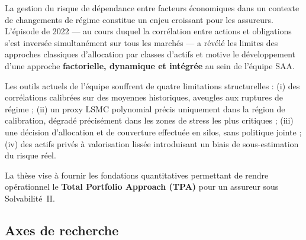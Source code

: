 \documentclass[10pt,a4paper]{article}
\begin{document}
La gestion du risque de dépendance entre facteurs économiques dans un contexte
de changements de régime constitue un enjeu croissant pour les assureurs.
L'épisode de 2022 --- au cours duquel la corrélation entre actions et
obligations s'est inversée simultanément sur tous les marchés --- a révélé les
limites des approches classiques d'allocation par classes d'actifs et motive le
développement d'une approche \textbf{factorielle, dynamique et intégrée} au
sein de l'équipe SAA.

Les outils actuels de l'équipe souffrent de quatre limitations structurelles :
(i) des corrélations calibrées sur des moyennes historiques, aveugles aux
ruptures de régime ; (ii) un proxy LSMC polynomial précis uniquement dans la
région de calibration, dégradé précisément dans les zones de stress les plus
critiques ; (iii) une décision d'allocation et de couverture effectuée en
silos, sans politique jointe ; (iv) des actifs privés à valorisation lissée
introduisant un biais de sous-estimation du risque réel.

La thèse vise à fournir les fondations quantitatives permettant de rendre
opérationnel le \textbf{Total Portfolio Approach (TPA)} pour un assureur sous
Solvabilité~II.

\subsection{Axes de recherche}
\end{document}
